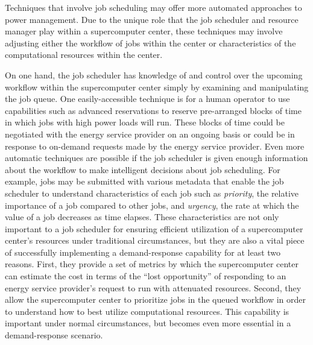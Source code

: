 Techniques that involve job scheduling may offer more automated
approaches to power management.  Due to the unique role that the job
scheduler and resource manager play within a supercomputer center,
these techniques may involve adjusting either the workflow of jobs
within the center or characteristics of the computational resources
within the center.

On one hand, the job scheduler has knowledge of and control over the
upcoming workflow within the supercomputer center simply by examining
and manipulating the job queue.  One easily-accessible technique is
for a human operator to use capabilities such as advanced reservations
to reserve pre-arranged blocks of time in which jobs with high power
loads will run.  These blocks of time could be negotiated with the
energy service provider on an ongoing basis or could be in response to
on-demand requests made by the energy service provider.  Even more
automatic techniques are possible if the job scheduler is given enough
information about the workflow to make intelligent decisions about job
scheduling.  For example, jobs may be submitted with various metadata
that enable the job scheduler to understand characteristics of each
job such as \textit{priority}, the relative importance of a job
compared to other jobs, and \textit{urgency}, the rate at which the
value of a job decreases as time elapses.  These characteristics are
not only important to a job scheduler for ensuring efficient
utilization of a supercomputer center's resources under traditional
circumstances, but they are also a vital piece of successfully
implementing a demand-response capability for at least two reasons.
First, they provide a set of metrics by which the supercomputer center
can estimate the cost in terms of the ``lost opportunity'' of
responding to an energy service provider's request to run with
attenuated resources.  Second, they allow the supercomputer center to
prioritize jobs in the queued workflow in order to understand how to
best utilize computational resources.  This capability is important
under normal circumstances, but becomes even more essential in a
demand-response scenario.

